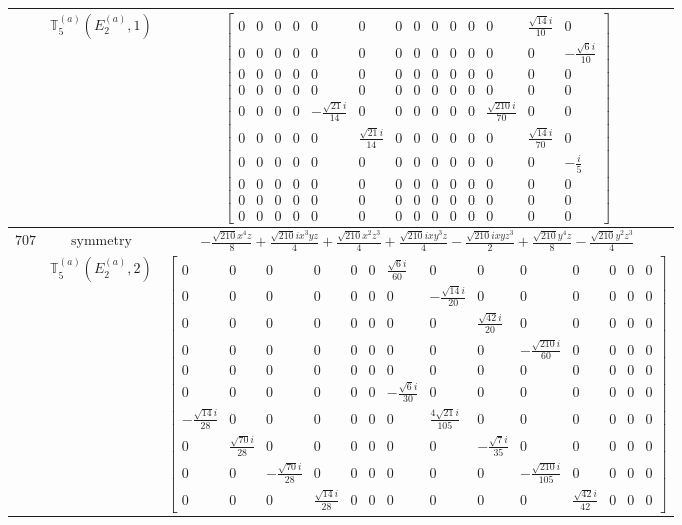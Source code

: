 \documentclass[fleqn,8pt,landscape]{jsarticle}
\begin{document}
\begin{longtable}{ccc}
$  $ & $ \mathbb{T}_{5}^{(a)}(E_{2}^{(a)},1) $ & $ \begin{bmatrix} 0 & 0 & 0 & 0 & 0 & 0 & 0 & 0 & 0 & 0 & 0 & 0 & \frac{\sqrt{14} i}{10} & 0 \\ 0 & 0 & 0 & 0 & 0 & 0 & 0 & 0 & 0 & 0 & 0 & 0 & 0 & - \frac{\sqrt{6} i}{10} \\ 0 & 0 & 0 & 0 & 0 & 0 & 0 & 0 & 0 & 0 & 0 & 0 & 0 & 0 \\ 0 & 0 & 0 & 0 & 0 & 0 & 0 & 0 & 0 & 0 & 0 & 0 & 0 & 0 \\ 0 & 0 & 0 & 0 & - \frac{\sqrt{21} i}{14} & 0 & 0 & 0 & 0 & 0 & 0 & \frac{\sqrt{210} i}{70} & 0 & 0 \\ 0 & 0 & 0 & 0 & 0 & \frac{\sqrt{21} i}{14} & 0 & 0 & 0 & 0 & 0 & 0 & \frac{\sqrt{14} i}{70} & 0 \\ 0 & 0 & 0 & 0 & 0 & 0 & 0 & 0 & 0 & 0 & 0 & 0 & 0 & - \frac{i}{5} \\ 0 & 0 & 0 & 0 & 0 & 0 & 0 & 0 & 0 & 0 & 0 & 0 & 0 & 0 \\ 0 & 0 & 0 & 0 & 0 & 0 & 0 & 0 & 0 & 0 & 0 & 0 & 0 & 0 \\ 0 & 0 & 0 & 0 & 0 & 0 & 0 & 0 & 0 & 0 & 0 & 0 & 0 & 0 \end{bmatrix} $ \\ \hline
$ 707 $ & $ \text{symmetry} $ & $ - \frac{\sqrt{210} x^{4} z}{8} + \frac{\sqrt{210} i x^{3} y z}{4} + \frac{\sqrt{210} x^{2} z^{3}}{4} + \frac{\sqrt{210} i x y^{3} z}{4} - \frac{\sqrt{210} i x y z^{3}}{2} + \frac{\sqrt{210} y^{4} z}{8} - \frac{\sqrt{210} y^{2} z^{3}}{4} $ \\
$  $ & $ \mathbb{T}_{5}^{(a)}(E_{2}^{(a)},2) $ & $ \begin{bmatrix} 0 & 0 & 0 & 0 & 0 & 0 & \frac{\sqrt{6} i}{60} & 0 & 0 & 0 & 0 & 0 & 0 & 0 \\ 0 & 0 & 0 & 0 & 0 & 0 & 0 & - \frac{\sqrt{14} i}{20} & 0 & 0 & 0 & 0 & 0 & 0 \\ 0 & 0 & 0 & 0 & 0 & 0 & 0 & 0 & \frac{\sqrt{42} i}{20} & 0 & 0 & 0 & 0 & 0 \\ 0 & 0 & 0 & 0 & 0 & 0 & 0 & 0 & 0 & - \frac{\sqrt{210} i}{60} & 0 & 0 & 0 & 0 \\ 0 & 0 & 0 & 0 & 0 & 0 & 0 & 0 & 0 & 0 & 0 & 0 & 0 & 0 \\ 0 & 0 & 0 & 0 & 0 & 0 & - \frac{\sqrt{6} i}{30} & 0 & 0 & 0 & 0 & 0 & 0 & 0 \\ - \frac{\sqrt{14} i}{28} & 0 & 0 & 0 & 0 & 0 & 0 & \frac{4 \sqrt{21} i}{105} & 0 & 0 & 0 & 0 & 0 & 0 \\ 0 & \frac{\sqrt{70} i}{28} & 0 & 0 & 0 & 0 & 0 & 0 & - \frac{\sqrt{7} i}{35} & 0 & 0 & 0 & 0 & 0 \\ 0 & 0 & - \frac{\sqrt{70} i}{28} & 0 & 0 & 0 & 0 & 0 & 0 & - \frac{\sqrt{210} i}{105} & 0 & 0 & 0 & 0 \\ 0 & 0 & 0 & \frac{\sqrt{14} i}{28} & 0 & 0 & 0 & 0 & 0 & 0 & \frac{\sqrt{42} i}{42} & 0 & 0 & 0 \end{bmatrix} $ \\ \hline

\end{longtable}
\end{document}
